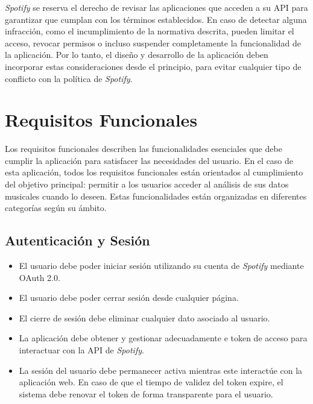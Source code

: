 \textit{Spotify} se reserva el derecho de revisar las aplicaciones que acceden a su API para garantizar que cumplan con los términos establecidos. En caso de detectar alguna infracción, como el incumplimiento de la normativa descrita, pueden limitar el acceso, revocar permisos o incluso suspender completamente la funcionalidad de la aplicación. Por lo tanto, el diseño y desarrollo de la aplicación deben incorporar estas consideraciones desde el principio, para evitar cualquier tipo de conflicto con la política de \textit{Spotify}.

\section{Requisitos Funcionales}

Los requisitos funcionales describen las funcionalidades esenciales que debe cumplir la aplicación para satisfacer las necesidades del usuario. En el caso de esta aplicación, todos los requisitos funcionales están orientados al cumplimiento del objetivo principal: permitir a los usuarios acceder al análisis de sus datos musicales cuando lo deseen. Estas funcionalidades están organizadas en diferentes categorías según su ámbito.

\subsection{Autenticación y Sesión}
\begin{itemize}
    \item El usuario debe poder iniciar sesión utilizando su cuenta de \textit{Spotify} mediante OAuth 2.0.
    \item El usuario debe poder cerrar sesión desde cualquier página.
    \item El cierre de sesión debe eliminar cualquier dato asociado al usuario.
    \item La aplicación debe obtener y gestionar adecuadamente e token de acceso para interactuar con la API de \textit{Spotify}.
    \item La sesión del usuario debe permanecer activa mientras este interactúe con la aplicación web. En caso de que el tiempo de validez del token expire, el sistema debe renovar el token de forma transparente para el usuario.
\end{itemize}

